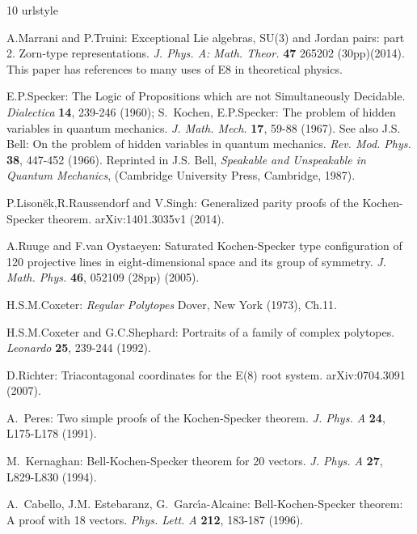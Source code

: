 \begin{thebibliography}{10}
\providecommand{\url}[1]{{#1}}
\providecommand{\urlprefix}{URL }
\expandafter\ifx\csname urlstyle\endcsname\relax
  \providecommand{\doi}[1]{DOI \discretionary{}{}{}#1}\else
  \providecommand{\doi}{DOI \discretionary{}{}{}\begingroup
  \urlstyle{rm}\Url}\fi

A.Marrani and P.Truini: Exceptional Lie algebras, SU(3) and Jordan pairs: part 2. Zorn-type representations. {\it J. Phys. A: Math. Theor.} \textbf{{\bf 47}} 265202 (30pp)(2014). This paper has references to many uses of E8 in theoretical physics.

E.P.Specker: The Logic of Propositions which are not Simultaneously Decidable. {\it Dialectica} {\bf 14}, 239-246 (1960); S.~Kochen, E.P.Specker: The problem of hidden variables in quantum mechanics. {\it J. Math. Mech.} \textbf{{\bf 17}}, 59-88 (1967). See also J.S. Bell: On the problem of hidden variables in quantum mechanics. {\it Rev. Mod. Phys.} \textbf{{\bf 38}}, 447-452 (1966).
\newblock Reprinted in J.S. Bell, {\em{Speakable and Unspeakable in Quantum Mechanics}}, (Cambridge University Press, Cambridge, 1987).

P.Lison{\u e}k,R.Raussendorf and V.Singh: Generalized parity proofs of the Kochen-Specker theorem. arXiv:1401.3035v1 (2014).

A.Ruuge and F.van Oystaeyen: Saturated Kochen-Specker type configuration of 120 projective lines in eight-dimensional space and its group of symmetry. {\it J. Math. Phys.} \textbf{{\bf 46}}, 052109 (28pp) (2005).

H.S.M.Coxeter: {\it Regular Polytopes} Dover, New York (1973), Ch.11.

H.S.M.Coxeter and G.C.Shephard: Portraits of a family of complex polytopes. {\it Leonardo} {\bf 25}, 239-244 (1992).

D.Richter: Triacontagonal coordinates for the E(8) root system. arXiv:0704.3091 (2007).

A.~Peres: Two simple proofs of the Kochen-Specker theorem. {\it J. Phys. A} \textbf{{\bf 24}}, L175-L178 (1991).

M.~Kernaghan: Bell-Kochen-Specker theorem for 20 vectors. {\it J. Phys. A} \textbf{{\bf 27}}, L829-L830 (1994).

A.~Cabello, J.M. Estebaranz, G.~{Garc{\'\i}a-Alcaine}: Bell-Kochen-Specker theorem: A proof with 18 vectors. {\it Phys. Lett. A} \textbf{{\bf 212}}, 183-187 (1996).


\end{thebibliography}
